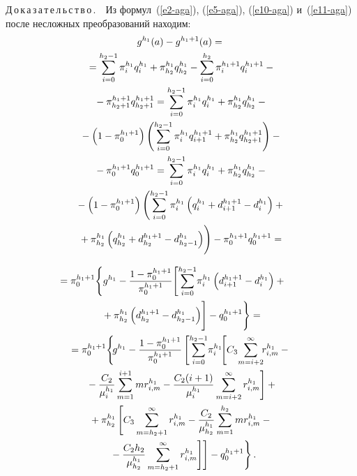 \begin{multicols}{2}
  \noindent
  Д\,о\,к\,а\,з\,а\,т\,е\,л\,ь\,с\,т\,в\,о\,.\ \ Из формул~(\ref{e2-aga}),  
(\ref{e5-aga}), (\ref{e10-aga}) и~(\ref{e11-aga}) после не\-слож\-ных 
преобразований находим:
  \begin{multline*}
  g^{h_1}(a)-g^{h_1+1}(a)={}\\
  {}=\sum\limits_{i=0}^{h_2-1} \pi_i^{h_1} q_i^{h_1} 
+\pi^{h_1}_{h_2} q^{h_1}_{h_2}-
 \sum\limits_{i=0}^{h_2} \pi_i^{h_1+1} q_i^{h_1+1} - {}\\
 {}- \pi^{h_1+1}_{h_2+1} 
q_{h_2+1}^{h_1+1} = \sum\limits_{i=0}^{h_2-1} \pi_i^{h_1} q_i^{h_1} 
+\pi_{h_2}^{h_1} q_{h_2}^{h_1}-{}\\
  {}- \left( 1-\pi_0^{h_1+1}\right) \left( \sum\limits_{i=0}^{h_2-1} \pi_i^{h_1} 
q_{i+1}^{h_1+1} + \pi_{h_2}^{h_1} q^{h_1+1}_{h_2+1}\right) -{}\\
{}- \pi_0^{h_1+1}  q_0^{h_1+1}= \sum\limits_{i=0}^{h_2-1} \pi_i^{h_1} q_i^{h_1} +\pi_{h_2}^{h_1} 
q_{h_2}^{h_1} -{}\\
{}- \left( 1-\pi_0^{h_1+1}\right)  \left( \sum\limits_{i=0}^{h_2-1} \pi_i^{h_1} \left( q_i^{h_1} 
+d_{i+1}^{h_1+1} -d_i^{h_1}\right) +{}\right.\\
\left.{}+\pi_{h_2}^{h_1} \left( q^{h_1}_{h_2} 
+d_{h_2}^{h_1+1} -d^{h_1}_{h_2-1}\right)\!
\vphantom{\sum\limits_{i=0}^{h_2-1}}
\right)- \pi_0^{h_1+1} q_0^{h_1+1} ={}
\end{multline*}

\noindent
\begin{multline}
\hspace*{-6mm}{}= \pi_0^{h_1+1} \!\left\{ 
  g^{h_1} -\fr{1-\pi_0^{h_1+1}}{\pi_0^{h_1+1}}\!\left[  \sum\limits_{i=0}^{h_2-1} 
\!\pi_i^{h_1} \left( d_{i+1}^{h_1+1} -d_i^{h_1}\right)+{}\right.\right.\\
  \left.\left.{}+ \pi_{h_2}^{h_1} \left( d_{h_2}^{h_1+1}  -
d^{h_1}_{h_2-1}\right)\!
\vphantom{\sum\limits_{i=0}^{h_2-1}}
\right] -q_0^{h_1+1}\right\}={}\\
  {}= \pi_0^{h_1+1} \!\left\{ \!g^{h_1}- \fr{1-\pi_0^{h_1+1}} {\pi_0^{h_1+1}}
  \left[\sum\limits_{i=0}^{h_2-1} \!\pi_i^{h_1} \!\!\left[ C_3\!\sum\limits^\infty_{m=i+2}\!\! r^{h_1}_{i,m} -{}\right.\right.\right.\\
\left.  {}-\fr{C_2}{\mu_i^{h_1}} 
\sum\limits_{m=1}^{i+1} mr^{h_1}_{i,m} -
\fr{C_2(i+1)}{\mu_i^{h_1}}\sum\limits^\infty_{m=i+2} r^{h_1}_{i,m}\right]+{}\\
{}+
  \pi^{h_1}_{h_2} \left[ C_3 \sum\limits^\infty_{m=h_2+1} r^{h_1}_{i,m} -
\fr{C_2}{\mu^{h_1}_{h_2}} \sum\limits^{h_2}_{m=1} mr^{h_1}_{i,m} -{}\right.\\
\left.\left.\left.{}-\fr{C_2h_2}{\mu_{h_2}^{h_1}} \sum\limits^\infty_{m=h_2+1} 
r^{h_1}_{i,m}\right]\right] -q_0^{h_1+1}\right\}.
  \label{e15-aga}
  \end{multline}
  

\end{multicols}
